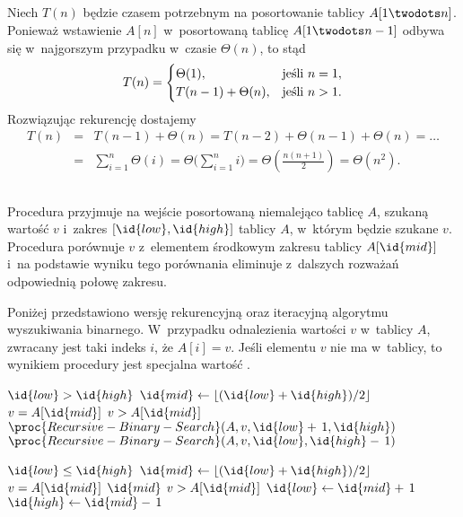 \subsection{} %
Niech $T(n)$ będzie czasem potrzebnym na posortowanie tablicy $A[1\twodots n]$. Ponieważ wstawienie $A[n]$ w~posortowaną tablicę $A[1\twodots n-1]$ odbywa się w~najgorszym przypadku w~czasie $\Theta(n)$, to stąd
\[
	T(n) =
	\begin{cases}
		\Theta(1), & \hbox{jeśli }n=1, \\
		T(n-1)+\Theta(n), & \hbox{jeśli }n>1.
	\end{cases}
\]
Rozwiązując rekurencję dostajemy
\begin{eqnarray*}
	T(n) &=& T(n-1)+\Theta(n) = T(n-2)+\Theta(n-1)+\Theta(n) = \ldots \\
	&=& \sum_{i=1}^n\Theta(i) = \Theta\biggl(\sum_{i=1}^ni\biggr) = \Theta\left(\frac{n(n+1)}{2}\right) = \Theta(n^2).
\end{eqnarray*}

\subsection{} %
Procedura  przyjmuje na wejście posortowaną niemalejąco tablicę $A$, szukaną wartość $v$ i~zakres $[\id{low}, \id{high}]$ tablicy $A$, w~którym będzie szukane $v$. Procedura porównuje $v$ z~elementem środkowym zakresu tablicy $A[\id{mid}]$ i~na podstawie wyniku tego porównania eliminuje z~dalszych rozważań odpowiednią połowę zakresu.

Poniżej przedstawiono wersję rekurencyjną oraz iteracyjną algorytmu wyszukiwania binarnego. W~przypadku odnalezienia wartości $v$ w~tablicy $A$, zwracany jest taki indeks $i$, że $A[i]=v$. Jeśli elementu $v$ nie ma w~tablicy, to wynikiem procedury jest specjalna wartość .

\begin{codebox}
\li	\If $\id{low}>\id{high}$
\li		\Then
			\Return{}
		\End
\li	$\id{mid}\gets\lfloor(\id{low}+\id{high})/2\rfloor$
\li	\If $v=A[\id{mid}]$
\li		\Then
			\Return{}
		\End
\li	\If $v>A[\id{mid}]$
\li		\Then
			\Return $\proc{Recursive-Binary-Search}(A,v,\id{low}+\,1,\id{high})$
\li		\Else
			\Return $\proc{Recursive-Binary-Search}(A,v,\id{low},\id{high}-\,1)$
		\End
\end{codebox}

\begin{codebox}
\li	\While $\id{low}\le\id{high}$
\li		\Do
			$\id{mid}\gets\lfloor(\id{low}+\id{high})/2\rfloor$
\li			\If $v=A[\id{mid}]$
\li				\Then
					\Return $\id{mid}$
				\End
\li			\If $v>A[\id{mid}]$
\li				\Then
					$\id{low}\gets\id{mid}+\,1$
\li				\Else
					$\id{high}\gets\id{mid}-\,1$
				\End
		\End
\li	\Return {}
\end{codebox}

